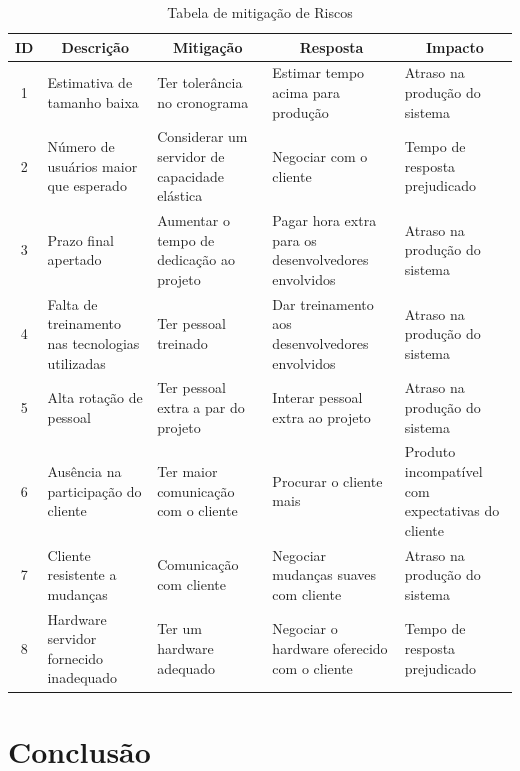 \documentclass[a4paper,11pt]{article}
\begin{document}
	\begin{table}[H]
		\begin{tabular}{c|p{}|p{}|p{}|p{}}
			\textbf{ID} & \multicolumn{1}{c|}{\textbf{Descrição}} & \multicolumn{1}{c|}{\textbf{Mitigação}} & \multicolumn{1}{c|}{\textbf{Resposta}} & \multicolumn{1}{c}{\textbf{Impacto}} \\
			\hline
			1 & Estimativa de tamanho baixa & Ter tolerância no cronograma & Estimar tempo acima para produção & Atraso na produção do sistema \\ \hline
			2 & Número de usuários maior que esperado & Considerar um servidor de capacidade elástica & Negociar com o cliente & Tempo de resposta prejudicado \\ \hline
			3 & Prazo final apertado & Aumentar o tempo de dedicação ao projeto & Pagar hora extra para os desenvolvedores envolvidos & Atraso na produção do sistema \\ \hline
			4 & Falta de treinamento nas tecnologias utilizadas & Ter pessoal treinado & Dar treinamento aos desenvolvedores envolvidos & Atraso na produção do sistema \\ \hline
			5 & Alta rotação de pessoal & Ter pessoal extra a par do projeto & Interar pessoal extra ao projeto & Atraso na produção do sistema \\ \hline
			6 & Ausência na participação do cliente & Ter maior comunicação com o cliente & Procurar o cliente mais & Produto incompatível com expectativas do cliente \\ \hline
			7 & Cliente resistente a mudanças & Comunicação com cliente & Negociar mudanças suaves com cliente & Atraso na produção do sistema \\ \hline
			8 & Hardware servidor fornecido inadequado & Ter um hardware adequado & Negociar o hardware oferecido com o cliente & Tempo de resposta prejudicado \\
		\end{tabular}
		\caption{Tabela de mitigação de Riscos}
	\end{table}


\section{Conclusão}
\end{document}
